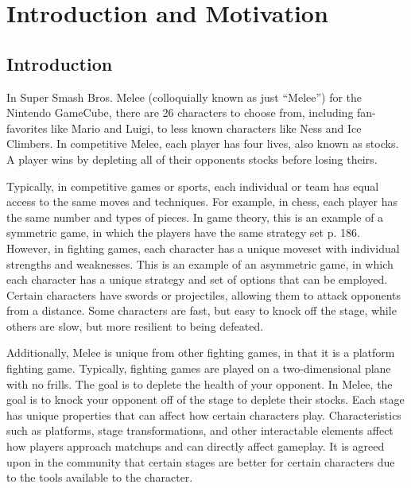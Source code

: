 \chapter{Introduction and Motivation}
\newpage

\section{Introduction}
In Super Smash Bros. Melee (colloquially known as just ``Melee'') for the Nintendo GameCube, there are 26 characters to choose from, including fan-favorites like Mario and Luigi, to less known characters like Ness and Ice Climbers. In competitive Melee, each player has four lives, also known as stocks. A player wins by depleting all of their opponents stocks before losing theirs.

\indent Typically, in competitive games or sports, each individual or team has equal access to the same moves and techniques. For example, in chess, each player has the same number and types of pieces. In game theory, this is an example of a symmetric game, in which the players have the same strategy set \citep{GameTheoryInAction} p. 186. However, in fighting games, each character has a unique moveset with individual strengths and weaknesses. This is an example of an asymmetric game, in which each character has a unique strategy and set of options that can be employed. Certain characters have swords or projectiles, allowing them to attack opponents from a distance. Some characters are fast, but easy to knock off the stage, while others are slow, but more resilient to being defeated.

\indent Additionally, Melee is unique from other fighting games, in that it is a platform fighting game. Typically, fighting games are played on a two-dimensional plane with no frills. The goal is to deplete the health of your opponent. In Melee, the goal is to knock your opponent off of the stage to deplete their stocks. Each stage has unique properties that can affect how certain characters play. Characteristics such as platforms, stage transformations, and other interactable elements affect how players approach matchups and can directly affect gameplay. It is agreed upon in the community that certain stages are better for certain characters due to the tools available to the character.

